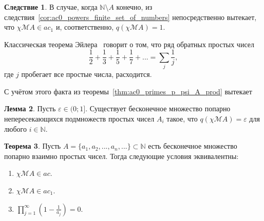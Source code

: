 \documentclass[a4paper,openbib]{article}
\theoremstyle{definition}
\newtheorem{lemma}{Лемма}[section]
\newtheorem{theorem}[lemma]{Теорема}
\newtheorem{corollary}[lemma]{Следствие}
\begin{document}
\begin{corollary}
	В случае, когда $\mathbb{N}\setminus A$ конечно,
	из следствия~\ref{cor:ac0_powers_finite_set_of_numbers} непосредственно вытекает, что $\chi\mathscr{M}A\in ac_1$
	и, соответственно, $q(\chi\mathscr{M}A)=1$.
\end{corollary}



Классическая теорема Эйлера~\cite{euler1737variae} говорит о том, что
ряд обратных простых чисел
\begin{equation}
	\frac{1}{2} + \frac{1}{3} + \frac{1}{5} + \frac{1}{7} + ...
	=
	\sum_j \frac{1}{j},
\end{equation}
где $j$ пробегает все простые числа, расходится.

С учётом этого факта
из теоремы~\ref{thm:ac0_primes_p_psi_A_prod} вытекает
\begin{lemma}
	Пусть $\varepsilon \in  (0; 1{]}$.
	Существует бесконечное множество попарно непересекающихся подмножеств простых чисел
	$A_i$ такое, что $q(\chi\mathscr{M}A)=\varepsilon$ для любого $i\in\mathbb{N}$.
\end{lemma}

%

\begin{theorem}
	Пусть $A=\{a_1, a_2, ..., a_n, ...\}\subset\mathbb{N}$ есть бесконечное множество попарно взаимно простых чисел.
	Тогда следующие условия эквивалентны:
	\begin{enumerate}[label=(\roman*)]
		\item
			$\chi\mathscr{M}A\in ac$.
		\item
			$\chi\mathscr{M}A\in ac_1$.
		\item
			$\prod_{j=1}^\infty \left(1-\frac{1}{a_j}\right) = 0$.
	\end{enumerate}
\end{theorem}
\end{document}
